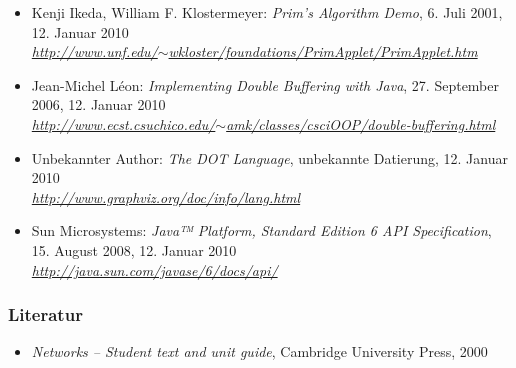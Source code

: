 \documentclass[a4paper,titlepage]{article}
\begin{document}
\begin{itemize}
\item Kenji Ikeda, William F. Klostermeyer: \emph{Prim's Algorithm Demo}, 6. Juli 2001, 12. Januar 2010 \\
	\emph{\href{http://www.unf.edu/~wkloster/foundations/PrimApplet/PrimApplet.htm}{http://www.unf.edu/$\sim$wkloster/foundations/PrimApplet/PrimApplet.htm}}
\item Jean-Michel Léon: \emph{Implementing Double Buffering with Java}, 27. September 2006, 12. Januar 2010 \\
	\emph{\href{http://www.ecst.csuchico.edu/~amk/classes/csciOOP/double-buffering.html}{http://www.ecst.csuchico.edu/$\sim$amk/classes/csciOOP/double-buffering.html}}
\item Unbekannter Author: \emph{The DOT Language}, unbekannte Datierung, 12. Januar 2010 \\
	\emph{\href{http://www.graphviz.org/doc/info/lang.html}{http://www.graphviz.org/doc/info/lang.html}}
\item Sun Microsystems: \emph{Java™ Platform, Standard Edition 6 API Specification}, 15. August 2008, 12. Januar 2010 \\
	\emph{\href{http://java.sun.com/javase/6/docs/api/}{http://java.sun.com/javase/6/docs/api/}}
\end{itemize}

\subsubsection{Literatur}
\begin{itemize}
\item \emph{Networks -- Student text and unit guide}, Cambridge University Press, 2000
\end{itemize}
\end{document}
